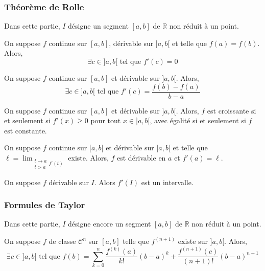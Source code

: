   \subsubsection{Théorème de Rolle}

  Dans cette partie, $I$ désigne un segment $[a,b]$ de $\mathbb{R}$ non réduit à un point.

  \begin{theorem}[Rolle]
    On suppose $f$ continue sur $[a,b]$, dérivable sur $]a,b[$ et telle que $f(a) = f(b)$. Alors,
    \[ \exists c \in ]a,b[ \text{ tel que } f'(c) = 0 \]
  \end{theorem}

  \begin{theorem}
    On suppose $f$ continue sur $[a,b]$ et dérivable sur $]a,b[$. Alors,
    \[ \exists c \in ]a,b[ \text{ tel que } f'(c) = \frac{f(b) - f(a)}{b-a} \]
  \end{theorem}

  \begin{corollary}
    On suppose $f$ continue sur $[a,b]$ et dérivable sur $]a,b[$. Alors, $f$ est croissante si et seulement si $f'(x) \geq 0$ pour tout $x \in ]a,b[$, avec égalité si et seulement si $f$ est constante.
  \end{corollary}

  \begin{corollary}
    On suppose $f$ continue sur $[a,b[$ et dérivable sur $]a,b[$ et telle que $\ell = \lim_{\substack{t \rightarrow a \\ t > a} f'(t)}$ existe. Alors, $f$ est dérivable en $a$ et $f'(a) = \ell$.
  \end{corollary}


  \begin{theorem}[Darboux]
    On suppose $f$ dérivable sur $I$. Alors $f'(I)$ est un intervalle.
  \end{theorem}

  \subsubsection{Formules de Taylor}


  Dans cette partie, $I$ désigne encore un segment $[a,b]$ de $\mathbb{R}$ non réduit à un point.

  \begin{theorem}
    On suppose $f$ de classe $\mathcal{C}^n$ sur $[a,b]$ telle que $f^{(n+1)}$ existe sur $]a,b[$. Alors,
    \[ \exists c \in ]a,b[ \text{ tel que } f(b) = \sum_{k=0}^{n} \frac{f^{(k)} (a)}{k!} (b-a)^k + \frac{f^{(n+1)}(c)}{(n+1)!} (b-a)^{n+1} \]
  \end{theorem}

